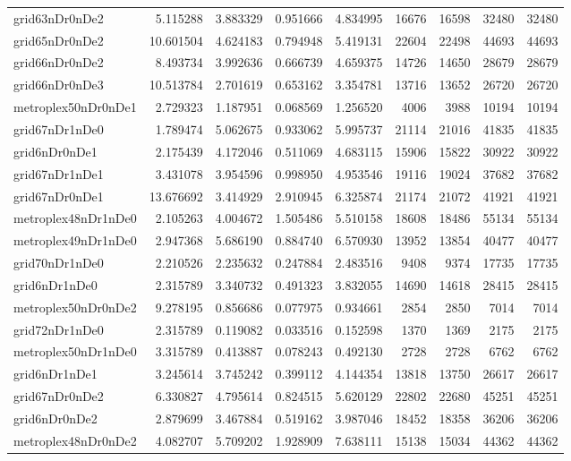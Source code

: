 \begin{longtable}{|l|r|r|r|r|r|r|r|r|}
grid63nDr0nDe2 & 5.115288 & 3.883329 & 0.951666 & 4.834995 & 16676 & 16598 & 32480 & 32480 \\
grid65nDr0nDe2 & 10.601504 & 4.624183 & 0.794948 & 5.419131 & 22604 & 22498 & 44693 & 44693 \\
grid66nDr0nDe2 & 8.493734 & 3.992636 & 0.666739 & 4.659375 & 14726 & 14650 & 28679 & 28679 \\
grid66nDr0nDe3 & 10.513784 & 2.701619 & 0.653162 & 3.354781 & 13716 & 13652 & 26720 & 26720 \\
metroplex50nDr0nDe1 & 2.729323 & 1.187951 & 0.068569 & 1.256520 & 4006 & 3988 & 10194 & 10194 \\
grid67nDr1nDe0 & 1.789474 & 5.062675 & 0.933062 & 5.995737 & 21114 & 21016 & 41835 & 41835 \\
grid6nDr0nDe1 & 2.175439 & 4.172046 & 0.511069 & 4.683115 & 15906 & 15822 & 30922 & 30922 \\
grid67nDr1nDe1 & 3.431078 & 3.954596 & 0.998950 & 4.953546 & 19116 & 19024 & 37682 & 37682 \\
grid67nDr0nDe1 & 13.676692 & 3.414929 & 2.910945 & 6.325874 & 21174 & 21072 & 41921 & 41921 \\
metroplex48nDr1nDe0 & 2.105263 & 4.004672 & 1.505486 & 5.510158 & 18608 & 18486 & 55134 & 55134 \\
metroplex49nDr1nDe0 & 2.947368 & 5.686190 & 0.884740 & 6.570930 & 13952 & 13854 & 40477 & 40477 \\
grid70nDr1nDe0 & 2.210526 & 2.235632 & 0.247884 & 2.483516 & 9408 & 9374 & 17735 & 17735 \\
grid6nDr1nDe0 & 2.315789 & 3.340732 & 0.491323 & 3.832055 & 14690 & 14618 & 28415 & 28415 \\
metroplex50nDr0nDe2 & 9.278195 & 0.856686 & 0.077975 & 0.934661 & 2854 & 2850 & 7014 & 7014 \\
grid72nDr1nDe0 & 2.315789 & 0.119082 & 0.033516 & 0.152598 & 1370 & 1369 & 2175 & 2175 \\
metroplex50nDr1nDe0 & 3.315789 & 0.413887 & 0.078243 & 0.492130 & 2728 & 2728 & 6762 & 6762 \\
grid6nDr1nDe1 & 3.245614 & 3.745242 & 0.399112 & 4.144354 & 13818 & 13750 & 26617 & 26617 \\
grid67nDr0nDe2 & 6.330827 & 4.795614 & 0.824515 & 5.620129 & 22802 & 22680 & 45251 & 45251 \\
grid6nDr0nDe2 & 2.879699 & 3.467884 & 0.519162 & 3.987046 & 18452 & 18358 & 36206 & 36206 \\
metroplex48nDr0nDe2 & 4.082707 & 5.709202 & 1.928909 & 7.638111 & 15138 & 15034 & 44362 & 44362 \\

\end{longtable}
